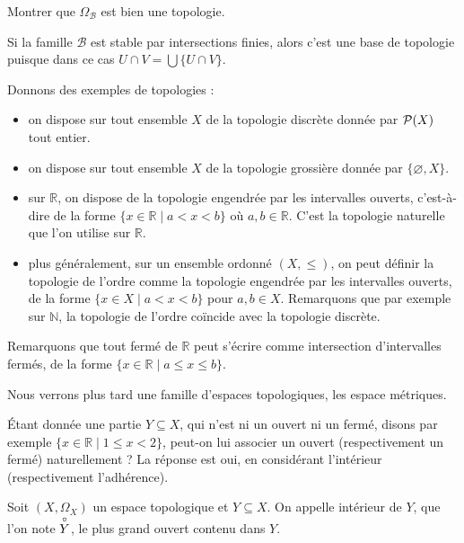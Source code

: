 \begin{exercise}
  Montrer que $\Omega_{\mathcal B}$ est bien une topologie.
\end{exercise}

\begin{remark}
  Si la famille $\mathcal B$ est stable par intersections finies, alors c'est
  une base de topologie puisque dans ce cas $U \cap V = \bigcup \{U \cap V\}$.
\end{remark}

\begin{example}
  Donnons des exemples de topologies :
  \begin{itemize}
  \item on dispose sur tout ensemble $X$ de la topologie discrète donnée par
    $\mathcal{P}(X)$ tout entier.
  \item on dispose sur tout ensemble $X$ de la topologie grossière donnée
    par $\{\varnothing,X\}$.
  \item sur $\mathbb R$, on dispose de la topologie engendrée par les
    intervalles ouverts, c'est-à-dire de la forme
    $\{x \in \mathbb R \mid a < x < b\}$ où
    $a,b\in\mathbb R$. C'est la topologie naturelle que l'on utilise sur
    $\mathbb R$.
  \item plus généralement, sur un ensemble ordonné $(X,\leq)$, on peut définir
    la topologie de l'ordre comme la topologie engendrée par les intervalles
    ouverts, de la forme $\{x\in X\mid a < x < b\}$ pour $a,b\in X$.
    Remarquons que par exemple sur $\mathbb N$, la topologie de l'ordre coïncide
    avec la topologie discrète.
  \end{itemize}
\end{example}

Remarquons que tout fermé de $\mathbb R$ peut s'écrire comme intersection
d'intervalles fermés, de la forme $\{x\in \mathbb R \mid a\leq  x \leq b\}$.

Nous verrons plus tard une famille d'espaces topologiques, les espace métriques.

\'Etant donnée une partie $Y\subseteq X$, qui n'est ni un ouvert ni un fermé,
disons par exemple $\{x\in\mathbb R\mid 1 \leq x < 2\}$, peut-on lui associer
un ouvert (respectivement un fermé) naturellement ? La réponse est oui, en
considérant l'intérieur (respectivement l'adhérence).

\begin{definition}[Intérieur]
  Soit $(X,\Omega_X)$ un espace topologique et $Y\subseteq X$. On appelle
  intérieur de $Y$, que l'on note $\overset{\circ}{Y}$, le plus grand ouvert contenu dans
  $Y$.
\end{definition}

